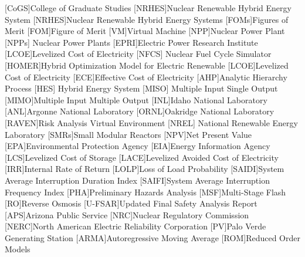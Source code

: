 \documentclass[12pt]{UIdahoMastersThesis}
\begin{document}
\begin{acronym}[NRHES]  %
    [CoGS]{College of Graduate Studies}
    [NRHES]{Nuclear Renewable Hybrid Energy System}
    [NRHES]{Nuclear Renewable Hybrid Energy Systems}
    [FOMs]{Figures of Merit}
    [FOM]{Figure of Merit}
    [VM]{Virtual Machine}  %
    [NPP]{Nuclear Power Plant}
    [NPPs] {Nuclear Power Plants}
    [EPRI]{Electric Power Research Institute}
     [LCOE]{Levelized Cost of Electricity}
    [NFCS] {Nuclear Fuel Cycle Simulator}
    [HOMER]{Hybrid Optimization Model for Electric Renewable}
    [LCOE]{Levelized Cost of Electricity}
    [ECE]{Effective Cost of Electricity}
    [AHP]{Analytic Hierarchy Process}
    [HES] {Hybrid Energy System}
    [MISO] {Multiple Input Single Output}
    [MIMO]{Multiple Input Multiple Output}
    [INL]{Idaho National Laboratory}
    [ANL]{Argonne National Laboratory}
    [ORNL]{Oakridge National Laboratory}
    [RAVEN]{Risk Analysis Virtual Environment}
     [NREL] {National Renewable Energy Laboratory}
    [SMRs]{Small Modular Reactors}
    [NPV]{Net Present Value}
    [EPA]{Environmental Protection Agency}
    [EIA]{Energy Information Agency}
    [LCS]{Levelized Cost of Storage}
    [LACE]{Levelized Avoided Cost of Electricity}
    [IRR]{Internal Rate of Return}
    [LOLP]{Loss of Load Probability}
    [SAIDI]{System Average Interruption Duration Index}
    [SAIFI]{System Average Interruption Frequency Index}
    [PHA]{Preliminary Hazards Analysis}
    [MSF]{Multi-Stage Flash}
    [RO]{Reverse Osmosis}
    [U-FSAR]{Updated Final Safety Analysis Report}
    [APS]{Arizona Public Service}
    [NRC]{Nuclear Regulatory Commission}
    [NERC]{North American Electric Reliability Corporation}
    [PV]{Palo Verde Generating Station}
    [ARMA]{Autoregressive Moving Average}
    [ROM]{Reduced Order Models}

    
\end{acronym}
\end{document}
